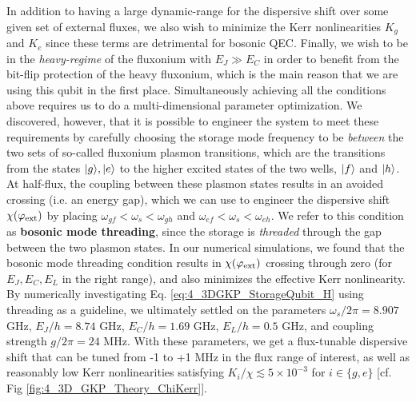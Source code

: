 In addition to having a large dynamic-range for the dispersive shift over some given set of external fluxes, we also wish to minimize the Kerr nonlinearities $K_g$ and $K_e$ since these terms are detrimental for bosonic QEC. Finally, we wish to be in the \textit{heavy-regime} of the fluxonium with $E_J \gg E_C$ in order to benefit from the bit-flip protection of the heavy fluxonium, which is the main reason that we are using this qubit in the first place. Simultaneously achieving all the conditions above requires us to do a multi-dimensional parameter optimization. We discovered, however, that it is possible to engineer the system to meet these requirements by carefully choosing the storage mode frequency to be \textit{between} the two sets of so-called fluxonium plasmon transitions, which are the transitions from the states $\lvert g\rangle, \lvert e\rangle$ to the higher excited states of the two wells, $\lvert f\rangle$ and $\lvert h\rangle$. At half-flux, the coupling between these plasmon states results in an avoided crossing (i.e. an energy gap), which we can use to engineer the dispersive shift $\chi(\varphi_{\rm ext})$ by placing $\omega_{gf} < \omega_s < \omega_{gh}$ and $\omega_{ef} < \omega_s < \omega_{eh}$. We refer to this condition as  \textbf{bosonic mode threading}, since the storage is 
\textit{threaded} through the gap between the two plasmon states. In our numerical simulations, we found that the bosonic mode threading condition results in $\chi(\varphi_{\rm ext})$ crossing through zero (for $E_J, E_C, E_L$ in the right range), and also minimizes the effective Kerr nonlinearity. By numerically investigating Eq. \eqref{eq:4_3DGKP_StorageQubit_H} using threading as a guideline, we ultimately settled on the parameters $\omega_s/2\pi = 8.907$ GHz, $E_J/h = 8.74$ GHz, $E_C/h = 1.69$ GHz, $E_L/h = 0.5$ GHz, and coupling strength $g/2\pi = 24$ MHz. With these parameters, we get a flux-tunable dispersive shift that can be tuned from -1 to +1 MHz in the flux range of interest, as well as reasonably low Kerr nonlinearities satisfying $K_i/\chi \lesssim 5\times 10^{-3}$ for $i \in \{g, e\}$ [cf. Fig \ref{fig:4_3D_GKP_Theory_ChiKerr}]. 

